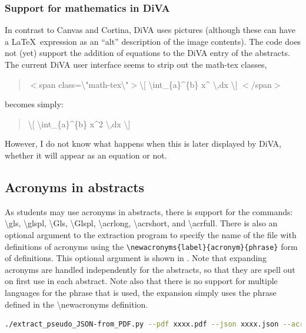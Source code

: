 \subsubsection{Support for mathematics in DiVA}
\label{sec:SupportForMathematicsInDiVA}
In contrast to Canvas and Cortina, DiVA uses pictures (although these can have a \LaTeX~expression as an “alt” description of the image contents).
The code does not (yet) support the addition of equations to the DiVA entry of the abstracts.
The current DiVA user interface seems to strip out the math-tex classes, \ie 

\begin{quote}
$<$span class=\textbackslash"math-tex\textbackslash"$>$\textbackslash [ \textbackslash int\_\{a\}\^{}\{b\} x\^{}  \textbackslash ,dx \textbackslash ] $<$/span$>$
\end{quote}

becomes simply:
\begin{quote}
\textbackslash [ \textbackslash int\_\{a\}\^{}\{b\} x\^{}2  \textbackslash ,dx \textbackslash ]
\end{quote}
\noindent However, I do not know what happens when this is later displayed by DiVA, \ie whether it will appear as an equation or not.


\subsection{Acronyms in abstracts}
\label{sec:AcronymsInAbstracts}

As students may use acronyms in abstracts, there is support for the commands: \textbackslash gls{}, \textbackslash glspl{}, \textbackslash Gls{}, \textbackslash Glspl{}, \textbackslash acrlong{}, \textbackslash acrshort{}, and \textbackslash acrfull{}. There is also an optional argument to the extraction program to specify the name of the file with definitions of acronyms using the \texttt{\textbackslash newacronyms\{label\}\{acronym\}\{phrase\}} form of definitions. This optional argument is shown in . Note that expanding acronyms are handled independently for the abstracts, so that they are spell out on first use in each abstract. Note also that there is no support for multiple languages for the phrase that is used, \ie the expansion simply uses the phrase defined in the \textbackslash newacronyms definition.
\begin{lstlisting}[language={bash}, caption={Specifying acronyms file}, label=lst:specifyingAcronymsFile]
./extract_pseudo_JSON-from_PDF.py --pdf xxxx.pdf --json xxxx.json --acronyms acronyms.tex
\end{lstlisting}


